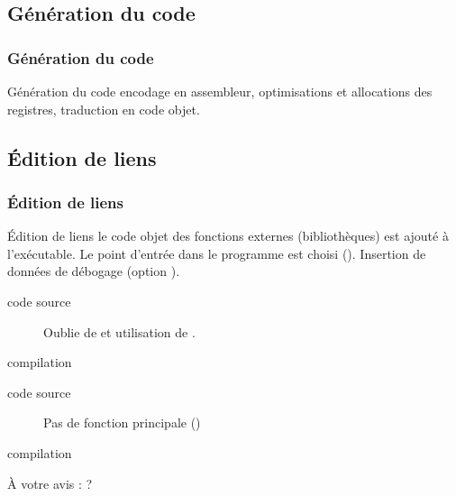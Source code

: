 \documentclass[xcolor=svgnames]{beamer}
\begin{document}
\subsection{Génération du code}
\begin{frame}
\frametitle{Génération du code}
\begin{block}{Génération du code}
  encodage en assembleur, optimisations et allocations des registres, traduction en code objet. 
\end{block}
\end{frame}

\subsection{Édition de liens}
\begin{frame}
\frametitle{Édition de liens}
\begin{block}{Édition de liens}
  le code objet des fonctions externes
  (bibliothèques) est ajouté à l'exécutable. Le point d'entrée dans le
  programme est choisi (). Insertion de données de débogage (option ).
\end{block}
\pause
\begin{description}
\item[code source] Oublie de  et utilisation de .
\item[compilation] 
\end{description}
\pause
\begin{description}
\item[code source] Pas de fonction principale ()
\item[compilation] 
\end{description}
\pause
À votre avis :  ?
\end{frame}
\end{document}
